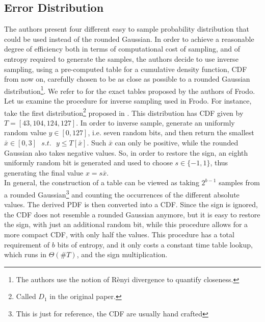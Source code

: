 \subsection{Error Distribution}
The authors present four different easy to sample probability distribution that could be used instead of the rounded Gaussian. In order to achieve a reasonable degree of efficiency both in terms of computational cost of sampling, and of entropy required to generate the samples, the authors decide to use inverse sampling, using a pre-computed table for a cumulative density function, CDF from now on, carefully chosen to be as close as possible to a rounded Gaussian distribution\footnote{The authors use the notion of R\`enyi divergence to quantify closeness.}. We refer to \cite{frodo} for the exact tables proposed by the authors of Frodo.\\
Let us examine the procedure for inverse sampling used in Frodo. For instance, take the first distribution\footnote{Called $D_1$ in the original paper.} proposed in \cite{frodo}. This distribution has CDF given by $T=[43,104,124,127]$. In order to inverse sample, generate an uniformly random value $y\in[0,127]$, i.e. seven random bits, and then return the smallest $\bar{x} \in [0,3]\text{ }s.t.\text{ }y\le T[\bar{x}]$. Such $\bar{x}$ can only be positive, while the rounded Gaussian also takes negative values. So, in order to restore the sign, an eighth uniformly random bit is generated and used to choose $s\in\{-1,1\}$, thus generating the final value $x=s\bar{x}$.\\
In general, the construction of a table can be viewed as taking $2^{b-1}$ samples from a rounded Gaussian\footnote{This is just for reference, the CDF are usually hand crafted} and counting the occurrences of the different absolute values. The derived PDF is then converted into a CDF. Since the sign is ignored, the CDF does not resemble a rounded Gaussian anymore, but it is easy to restore the sign, with just an additional random bit, while this procedure allows for a more compact CDF, with only half the values. This procedure has a total requirement of $b$ bits of entropy, and it only costs a constant time table lookup, which runs in $\Theta(\#T)$, and the sign multiplication.\\ 

